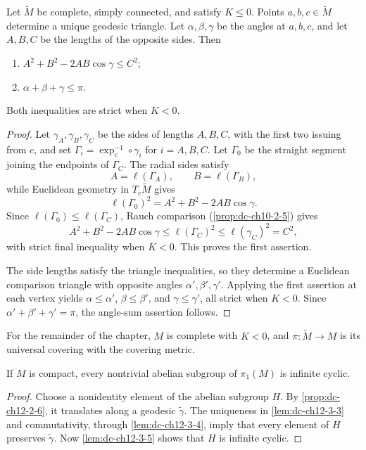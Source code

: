 \begin{lemma}
  \label{lem:dc-ch12-3-1}
  Let $\tilde M$ be complete, simply connected, and satisfy $K\leq0$. Points
  $a,b,c\in\tilde M$ determine a unique geodesic triangle. Let
  $\alpha,\beta,\gamma$ be the angles at $a,b,c$, and let $A,B,C$ be the
  lengths of the opposite sides. Then
  \begin{enumerate}
    \item $A^2+B^2-2AB\cos\gamma\leq C^2$;
    \item $\alpha+\beta+\gamma\leq\pi$.
  \end{enumerate}
  Both inequalities are strict when $K<0$.
\end{lemma}
\begin{proof}
  \sketch
  Let $\gamma_A,\gamma_B,\gamma_C$ be the sides of lengths $A,B,C$, with the
  first two issuing from $c$, and set
  $\Gamma_i=\exp_c^{-1}\circ\gamma_i$ for $i=A,B,C$. Let $\Gamma_0$ be the
  straight segment joining the endpoints of $\Gamma_C$. The radial sides satisfy
  \[
    A=\ell(\Gamma_A),\qquad B=\ell(\Gamma_B),
  \]
  while Euclidean geometry in $T_c\tilde M$ gives
  \[
    \ell(\Gamma_0)^2=A^2+B^2-2AB\cos\gamma.
  \]
  Since $\ell(\Gamma_0)\leq\ell(\Gamma_C)$, Rauch comparison
  (\cref{prop:dc-ch10-2-5}) gives
  \[
    A^2+B^2-2AB\cos\gamma
    \leq\ell(\Gamma_C)^2
    \leq\ell(\gamma_C)^2=C^2,
  \]
  with strict final inequality when $K<0$. This proves the first assertion.

  The side lengths satisfy the triangle inequalities, so they determine a
  Euclidean comparison triangle with opposite angles
  $\alpha',\beta',\gamma'$. Applying the first assertion at each vertex yields
  $\alpha\leq\alpha'$, $\beta\leq\beta'$, and
  $\gamma\leq\gamma'$, all strict when $K<0$. Since
  $\alpha'+\beta'+\gamma'=\pi$, the angle-sum assertion follows.
\end{proof}

For the remainder of the chapter, $M$ is complete with $K<0$, and
$\pi:\tilde M\to M$ is its universal covering with the covering metric.

\begin{theorem}
  \label{thm:dc-ch12-3-2}
  If $M$ is compact, every nontrivial abelian subgroup of $\pi_1(M)$ is
  infinite cyclic.
\end{theorem}
\begin{proof}
  \sketch
  Choose a nonidentity element of the abelian subgroup $H$. By
  \cref{prop:dc-ch12-2-6}, it translates along a geodesic
  $\tilde\gamma$. The uniqueness in \cref{lem:dc-ch12-3-3} and commutativity,
  through \cref{lem:dc-ch12-3-4}, imply that every element of $H$ preserves
  $\tilde\gamma$. Now \cref{lem:dc-ch12-3-5} shows that $H$ is infinite
  cyclic.
\end{proof}

